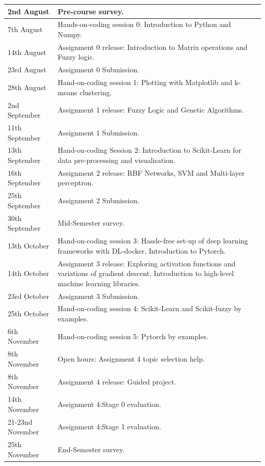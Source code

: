 \documentclass{article} %
\begin{document}
\begin{tabular}{ | p{10em} || p{25em} | }
\hline
2nd August & Pre-course survey. \\
\hline
7th August & Hands-on-coding session 0: Introduction to
             Python and Numpy.\\
\hline
14th August & Assignment 0 release: Introduction to Matrix operations
                            and Fuzzy logic. \\
\hline
23rd August & Assignment 0 Submission. \\
\hline
28th August & Hand-on-coding session 1: Plotting with Matplotlib and k-means clustering. \\
\hline
2nd September & Assignment 1 release: Fuzzy Logic and Genetic Algorithms. \\
\hline
11th September & Assignment 1 Submission.\\
\hline
13th September & Hand-on-coding Session 2: Introduction to Scikit-Learn for data pre-processing and visualisation. \\
\hline
16th September & Assignment 2 release: RBF Networks, SVM and Multi-layer perceptron.\\
\hline
25th September & Assignment 2 Submission.\\
\hline
30th September & Mid-Semester survey.\\
\hline
13th October & Hand-on-coding session 3: Hassle-free set-up of deep learning frameworks with DL-docker, Introduction to Pytorch.\\
\hline
14th October & Assignment 3 release: Exploring activation functions and variations of gradient descent,
                                     Introduction to high-level machine learning libraries. \\
\hline
23rd October & Assignment 3 Submission. \\
\hline
25th October & Hand-on-coding session 4: Scikit-Learn and Scikit-fuzzy by examples.\\
\hline
6th November & Hand-on-coding session 5: Pytorch by examples.\\
\hline
8th November & Open hours: Assignment 4 topic selection help.\\
\hline
8th November & Assignment 4 release: Guided project.\\
\hline
14th November & Assignment 4:Stage 0 evaluation.\\
\hline
21-23nd November & Assignment 4:Stage 1 evaluation.\\
\hline
25th November & End-Semester survey.\\
\hline
\end{tabular}
\end{document}
